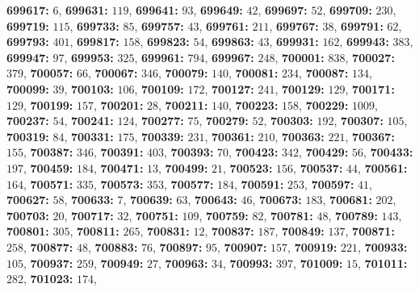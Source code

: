 \textsf{\bfseries 699617:} $6$, \textsf{\bfseries 699631:} $119$, \textsf{\bfseries 699641:} $93$, \textsf{\bfseries 699649:} $42$, \textsf{\bfseries 699697:} $52$, \textsf{\bfseries 699709:} $230$, \textsf{\bfseries 699719:} $115$, \textsf{\bfseries 699733:} $85$, \textsf{\bfseries 699757:} $43$, \textsf{\bfseries 699761:} $211$, \textsf{\bfseries 699767:} $38$, \textsf{\bfseries 699791:} $62$, \textsf{\bfseries 699793:} $401$, \textsf{\bfseries 699817:} $158$, \textsf{\bfseries 699823:} $54$, \textsf{\bfseries 699863:} $43$, \textsf{\bfseries 699931:} $162$, \textsf{\bfseries 699943:} $383$, \textsf{\bfseries 699947:} $97$, \textsf{\bfseries 699953:} $325$, \textsf{\bfseries 699961:} $794$, \textsf{\bfseries 699967:} $248$, \textsf{\bfseries 700001:} $838$, \textsf{\bfseries 700027:} $379$, \textsf{\bfseries 700057:} $66$, \textsf{\bfseries 700067:} $346$, \textsf{\bfseries 700079:} $140$, \textsf{\bfseries 700081:} $234$, \textsf{\bfseries 700087:} $134$, \textsf{\bfseries 700099:} $39$, \textsf{\bfseries 700103:} $106$, \textsf{\bfseries 700109:} $172$, \textsf{\bfseries 700127:} $241$, \textsf{\bfseries 700129:} $129$, \textsf{\bfseries 700171:} $129$, \textsf{\bfseries 700199:} $157$, \textsf{\bfseries 700201:} $28$, \textsf{\bfseries 700211:} $140$, \textsf{\bfseries 700223:} $158$, \textsf{\bfseries 700229:} $1009$, \textsf{\bfseries 700237:} $54$, \textsf{\bfseries 700241:} $124$, \textsf{\bfseries 700277:} $75$, \textsf{\bfseries 700279:} $52$, \textsf{\bfseries 700303:} $192$, \textsf{\bfseries 700307:} $105$, \textsf{\bfseries 700319:} $84$, \textsf{\bfseries 700331:} $175$, \textsf{\bfseries 700339:} $231$, \textsf{\bfseries 700361:} $210$, \textsf{\bfseries 700363:} $221$, \textsf{\bfseries 700367:} $155$, \textsf{\bfseries 700387:} $346$, \textsf{\bfseries 700391:} $403$, \textsf{\bfseries 700393:} $70$, \textsf{\bfseries 700423:} $342$, \textsf{\bfseries 700429:} $56$, \textsf{\bfseries 700433:} $197$, \textsf{\bfseries 700459:} $184$, \textsf{\bfseries 700471:} $13$, \textsf{\bfseries 700499:} $21$, \textsf{\bfseries 700523:} $156$, \textsf{\bfseries 700537:} $44$, \textsf{\bfseries 700561:} $164$, \textsf{\bfseries 700571:} $335$, \textsf{\bfseries 700573:} $353$, \textsf{\bfseries 700577:} $184$, \textsf{\bfseries 700591:} $253$, \textsf{\bfseries 700597:} $41$, \textsf{\bfseries 700627:} $58$, \textsf{\bfseries 700633:} $7$, \textsf{\bfseries 700639:} $63$, \textsf{\bfseries 700643:} $46$, \textsf{\bfseries 700673:} $183$, \textsf{\bfseries 700681:} $202$, \textsf{\bfseries 700703:} $20$, \textsf{\bfseries 700717:} $32$, \textsf{\bfseries 700751:} $109$, \textsf{\bfseries 700759:} $82$, \textsf{\bfseries 700781:} $48$, \textsf{\bfseries 700789:} $143$, \textsf{\bfseries 700801:} $305$, \textsf{\bfseries 700811:} $265$, \textsf{\bfseries 700831:} $12$, \textsf{\bfseries 700837:} $187$, \textsf{\bfseries 700849:} $137$, \textsf{\bfseries 700871:} $258$, \textsf{\bfseries 700877:} $48$, \textsf{\bfseries 700883:} $76$, \textsf{\bfseries 700897:} $95$, \textsf{\bfseries 700907:} $157$, \textsf{\bfseries 700919:} $221$, \textsf{\bfseries 700933:} $105$, \textsf{\bfseries 700937:} $259$, \textsf{\bfseries 700949:} $27$, \textsf{\bfseries 700963:} $34$, \textsf{\bfseries 700993:} $397$, \textsf{\bfseries 701009:} $15$, \textsf{\bfseries 701011:} $282$, \textsf{\bfseries 701023:} $174$, 
